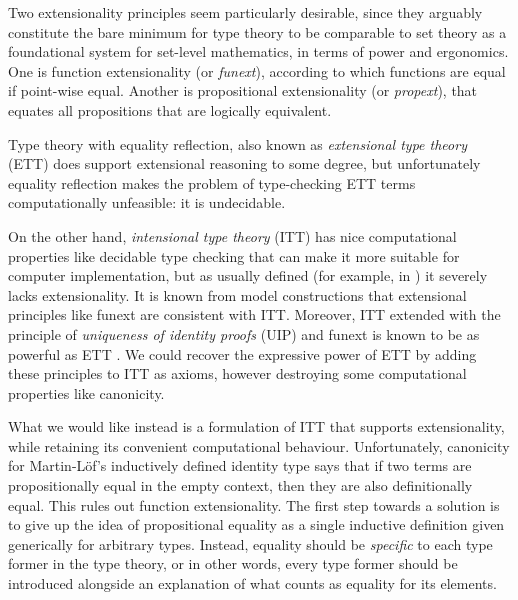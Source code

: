 \documentclass[autoref]{llncs}
\begin{document}
Two extensionality principles seem particularly desirable, since they arguably
constitute the bare minimum for type theory to be comparable to set theory as a
foundational system for set-level mathematics, in terms of power and ergonomics.
One is function extensionality (or \emph{funext}), according to which functions
are equal if point-wise equal. Another is propositional extensionality
(or \emph{propext}), that equates all propositions that are logically equivalent.

Type theory with equality reflection, also known as \emph{extensional type
  theory} (ETT) does support extensional reasoning to some degree, but
unfortunately equality reflection makes the problem of type-checking ETT terms
computationally unfeasible: it is undecidable.

On the other hand, \emph{intensional type theory} (ITT) has nice computational
properties like decidable type checking that can make it more suitable for
computer implementation, but as usually defined (for example, in \cite{mltt75})
it severely lacks extensionality.
%
It is known from model constructions that extensional principles like funext are
consistent with ITT.
%
Moreover, ITT extended with the principle of \emph{uniqueness of identity
  proofs} (UIP) and funext is known to be as powerful as ETT
\cite{conservativity}. We could recover the expressive power of ETT by adding
these principles to ITT as axioms, however destroying some computational
properties like canonicity.

What we would like instead is a formulation of ITT that supports extensionality,
while retaining its convenient computational behaviour.
%
Unfortunately, canonicity for Martin-L{\"o}f's inductively defined
identity type says that if two terms are propositionally equal in the
empty context, then they are also definitionally equal. This rules out
function extensionality.
%
The first step towards a solution is to give up the idea of propositional
equality as a single inductive definition given generically for arbitrary
types. Instead, equality should be \emph{specific} to each type former in the
type theory, or in other words, every type former should be introduced alongside
an explanation of what counts as equality for its elements.
\end{document}
